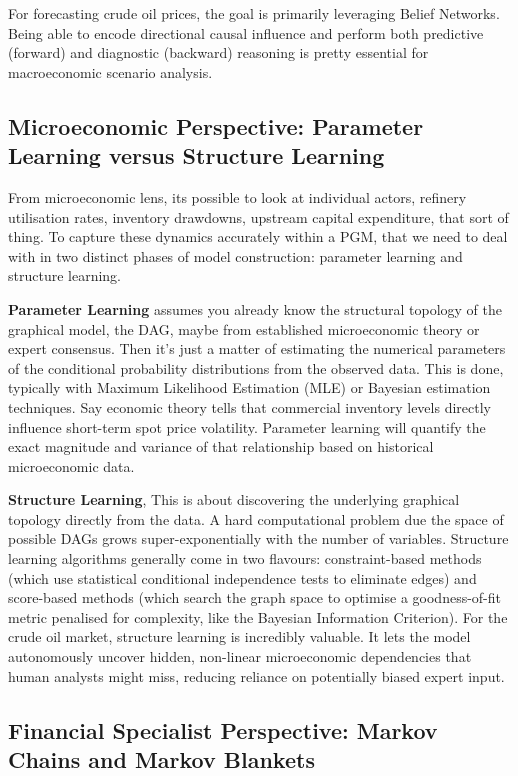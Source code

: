 \documentclass[11pt,a4paper]{article}
\begin{document}
For forecasting crude oil prices, the goal is primarily leveraging Belief Networks. Being 
able to encode directional causal influence and perform both predictive (forward) 
and diagnostic (backward) reasoning is pretty essential for macroeconomic scenario analysis.

\subsection{Microeconomic Perspective: Parameter Learning versus Structure Learning}

From microeconomic lens, its possible to look at individual actors, refinery utilisation 
rates, inventory drawdowns, upstream capital expenditure, that sort of thing. 
To capture these dynamics accurately within a PGM, that we need to deal with in 
two distinct phases of model construction: parameter learning and structure learning.

\textbf{Parameter Learning} assumes you already know the structural topology 
of the graphical model, the DAG, maybe from established microeconomic theory or
 expert consensus. Then it's just a matter of estimating the numerical parameters 
 of the conditional probability distributions from the observed data. 
 This is done, typically with Maximum Likelihood Estimation (MLE) or Bayesian 
 estimation techniques. Say economic theory tells that commercial inventory 
 levels directly influence short-term spot price volatility. Parameter learning 
 will quantify the exact magnitude and variance of that relationship 
 based on historical microeconomic data.

\textbf{Structure Learning}, This is about discovering the underlying graphical 
topology directly from the data. A hard computational problem due the space of 
possible DAGs grows super-exponentially with the number of variables. Structure 
learning algorithms generally come in two flavours: constraint-based methods 
(which use statistical conditional independence tests to eliminate edges) 
and score-based methods (which search the graph space to optimise a goodness-of-fit 
metric penalised for complexity, like the Bayesian Information Criterion). 
For the crude oil market, structure learning is incredibly valuable. 
It lets the model autonomously uncover hidden, non-linear microeconomic 
dependencies that human analysts might miss, reducing reliance on potentially 
biased expert input.

\subsection{Financial Specialist Perspective: Markov Chains and Markov Blankets}
\end{document}
